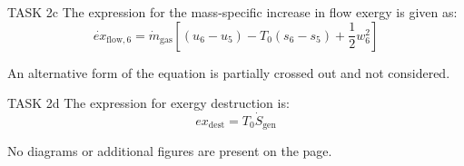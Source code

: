 TASK 2c  
The expression for the mass-specific increase in flow exergy is given as:  
\[
\dot{ex}_{\text{flow},6} = \dot{m}_{\text{gas}} \left[ (u_6 - u_5) - T_0 (s_6 - s_5) + \frac{1}{2} w_6^2 \right]
\]  

An alternative form of the equation is partially crossed out and not considered.  

TASK 2d  
The expression for exergy destruction is:  
\[
ex_{\text{dest}} = T_0 \dot{S}_{\text{gen}}
\]  

No diagrams or additional figures are present on the page.